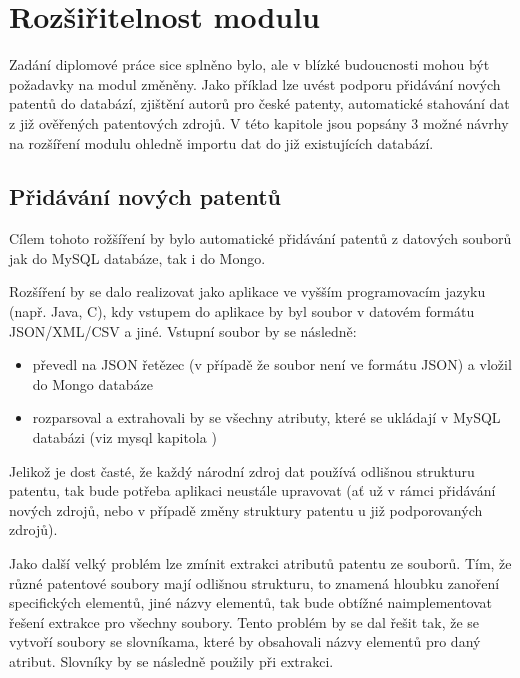 \chapter{Rozšiřitelnost modulu}
Zadání diplomové práce sice splněno bylo, ale v blízké budoucnosti mohou být požadavky na modul změněny. Jako příklad lze uvést podporu přidávání nových patentů do databází, zjištění autorů pro české patenty, automatické stahování dat z již ověřených patentových zdrojů. V této kapitole jsou popsány 3 možné návrhy na rozšíření modulu ohledně importu dat do již existujících databází.

\section{Přidávání nových patentů}
Cílem tohoto rožšíření by bylo automatické přidávání patentů z datových souborů jak do MySQL databáze, tak i do Mongo.

Rozšíření by se dalo realizovat jako aplikace ve vyšším programovacím jazyku (např. Java, C), kdy vstupem do aplikace by byl soubor v datovém formátu JSON/XML/CSV a jiné. Vstupní soubor by se následně:
\begin{itemize}
\item převedl na JSON řetězec (v případě že soubor není ve formátu JSON) a vložil do Mongo databáze
\item rozparsoval a extrahovali by se všechny atributy, které se ukládají v MySQL databázi (viz mysql kapitola )
\end{itemize}

Jelikož je dost časté, že každý národní zdroj dat používá odlišnou strukturu patentu, tak bude potřeba aplikaci neustále upravovat (ať už v rámci přidávání nových zdrojů, nebo v případě změny struktury patentu u již podporovaných zdrojů).

Jako další velký problém lze zmínit extrakci atributů patentu ze souborů. Tím, že různé patentové soubory mají odlišnou strukturu, to znamená hloubku zanoření specifických elementů, jiné názvy elementů, tak bude obtížné naimplementovat řešení extrakce pro všechny soubory. Tento problém by se dal řešit tak, že se vytvoří soubory se slovníkama, které by obsahovali názvy elementů pro daný atribut. Slovníky by se následně použily při extrakci.

